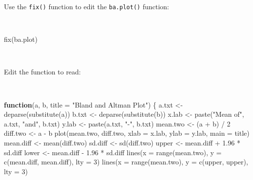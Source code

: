 \documentclass[
  12pt,
  a4paper]{book}
\newenvironment{Shaded}{\begin{snugshade}}{\end{snugshade}}
\newcommand{\AttributeTok}[1]{\textcolor[rgb]{0.77,0.63,0.00}{#1}}
\newcommand{\ControlFlowTok}[1]{\textcolor[rgb]{0.13,0.29,0.53}{\textbf{#1}}}
\newcommand{\DecValTok}[1]{\textcolor[rgb]{0.00,0.00,0.81}{#1}}
\newcommand{\FloatTok}[1]{\textcolor[rgb]{0.00,0.00,0.81}{#1}}
\newcommand{\FunctionTok}[1]{\textcolor[rgb]{0.00,0.00,0.00}{#1}}
\newcommand{\NormalTok}[1]{#1}
\newcommand{\OtherTok}[1]{\textcolor[rgb]{0.56,0.35,0.01}{#1}}
\newcommand{\SpecialCharTok}[1]{\textcolor[rgb]{0.00,0.00,0.00}{#1}}
\newcommand{\StringTok}[1]{\textcolor[rgb]{0.31,0.60,0.02}{#1}}
\begin{document}
Use the \texttt{fix()} function to edit the \texttt{ba.plot()} function:

~

\begin{Shaded}
\begin{Highlighting}[]
\FunctionTok{fix}\NormalTok{(ba.plot)}
\end{Highlighting}
\end{Shaded}

~

Edit the function to read:

~

\begin{Shaded}
\begin{Highlighting}[]
\ControlFlowTok{function}\NormalTok{(a, b, }\AttributeTok{title =} \StringTok{"Bland and Altman Plot"}\NormalTok{) \{}
\NormalTok{  a.txt }\OtherTok{\textless{}{-}} \FunctionTok{deparse}\NormalTok{(}\FunctionTok{substitute}\NormalTok{(a))}
\NormalTok{  b.txt }\OtherTok{\textless{}{-}} \FunctionTok{deparse}\NormalTok{(}\FunctionTok{substitute}\NormalTok{(b))}
\NormalTok{  x.lab }\OtherTok{\textless{}{-}} \FunctionTok{paste}\NormalTok{(}\StringTok{"Mean of"}\NormalTok{, a.txt, }\StringTok{"and"}\NormalTok{, b.txt)}
\NormalTok{  y.lab }\OtherTok{\textless{}{-}} \FunctionTok{paste}\NormalTok{(a.txt, }\StringTok{"{-}"}\NormalTok{, b.txt)}
\NormalTok{  mean.two }\OtherTok{\textless{}{-}}\NormalTok{ (a }\SpecialCharTok{+}\NormalTok{ b) }\SpecialCharTok{/} \DecValTok{2}
\NormalTok{  diff.two }\OtherTok{\textless{}{-}}\NormalTok{ a }\SpecialCharTok{{-}}\NormalTok{ b}
  \FunctionTok{plot}\NormalTok{(mean.two, diff.two, }\AttributeTok{xlab =}\NormalTok{ x.lab, }\AttributeTok{ylab =}\NormalTok{ y.lab, }\AttributeTok{main =}\NormalTok{ title) }
\NormalTok{  mean.diff }\OtherTok{\textless{}{-}} \FunctionTok{mean}\NormalTok{(diff.two)}
\NormalTok{  sd.diff }\OtherTok{\textless{}{-}} \FunctionTok{sd}\NormalTok{(diff.two)}
\NormalTok{  upper }\OtherTok{\textless{}{-}}\NormalTok{ mean.diff }\SpecialCharTok{+} \FloatTok{1.96} \SpecialCharTok{*}\NormalTok{ sd.diff}
\NormalTok{  lower }\OtherTok{\textless{}{-}}\NormalTok{ mean.diff }\SpecialCharTok{{-}} \FloatTok{1.96} \SpecialCharTok{*}\NormalTok{ sd.diff}
  \FunctionTok{lines}\NormalTok{(}\AttributeTok{x =} \FunctionTok{range}\NormalTok{(mean.two), }\AttributeTok{y =} \FunctionTok{c}\NormalTok{(mean.diff, mean.diff), }\AttributeTok{lty =} \DecValTok{3}\NormalTok{) }
  \FunctionTok{lines}\NormalTok{(}\AttributeTok{x =} \FunctionTok{range}\NormalTok{(mean.two), }\AttributeTok{y =} \FunctionTok{c}\NormalTok{(upper, upper), }\AttributeTok{lty =} \DecValTok{3}\NormalTok{)}

\end{Highlighting}
\end{Shaded}
\end{document}
